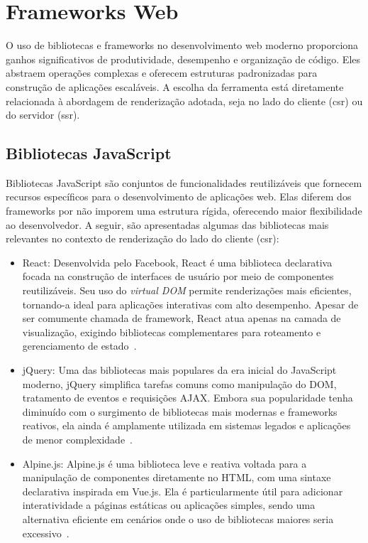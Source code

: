 \section{Frameworks Web}
\label{sec:frameworks-web}

O uso de bibliotecas e frameworks no desenvolvimento web moderno proporciona ganhos significativos de produtividade, desempenho e organização de código. Eles abstraem operações complexas e oferecem estruturas padronizadas para construção de aplicações escaláveis. A escolha da ferramenta está diretamente relacionada à abordagem de renderização adotada, seja no lado do cliente (\acrshort{csr}) ou do servidor (\acrshort{ssr}).

\subsection{Bibliotecas JavaScript}
\label{subsec:bibliotecas-js}

Bibliotecas JavaScript são conjuntos de funcionalidades reutilizáveis que fornecem recursos específicos para o desenvolvimento de aplicações web. Elas diferem dos frameworks por não imporem uma estrutura rígida, oferecendo maior flexibilidade ao desenvolvedor. A seguir, são apresentadas algumas das bibliotecas mais relevantes no contexto de renderização do lado do cliente (\acrshort{csr}):


\begin{itemize}
  \item React: Desenvolvida pelo Facebook, React é uma biblioteca declarativa focada na construção de interfaces de usuário por meio de componentes reutilizáveis. Seu uso do \textit{virtual DOM} permite renderizações mais eficientes, tornando-a ideal para aplicações interativas com alto desempenho. Apesar de ser comumente chamada de framework, React atua apenas na camada de visualização, exigindo bibliotecas complementares para roteamento e gerenciamento de estado~\cite{react2025}.

  \item jQuery: Uma das bibliotecas mais populares da era inicial do JavaScript moderno, jQuery simplifica tarefas comuns como manipulação do DOM, tratamento de eventos e requisições AJAX. Embora sua popularidade tenha diminuído com o surgimento de bibliotecas mais modernas e frameworks reativos, ela ainda é amplamente utilizada em sistemas legados e aplicações de menor complexidade~\cite{jquery2023}.

  \item Alpine.js: Alpine.js é uma biblioteca leve e reativa voltada para a manipulação de componentes diretamente no HTML, com uma sintaxe declarativa inspirada em Vue.js. Ela é particularmente útil para adicionar interatividade a páginas estáticas ou aplicações simples, sendo uma alternativa eficiente em cenários onde o uso de bibliotecas maiores seria excessivo~\cite{alpinejs2023}.
\end{itemize}


